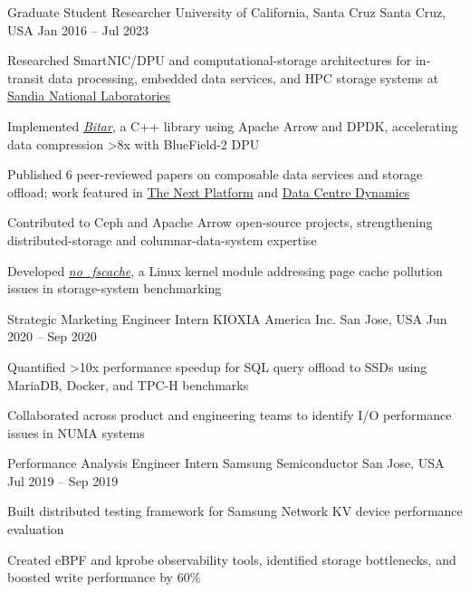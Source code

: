 \begin{cventries}
  \cventry
    {Graduate Student Researcher} %
    {University of California, Santa Cruz} %
    {Santa Cruz, USA} %
    {Jan 2016 -- Jul 2023} %
    {
      \begin{cvitems} %
        \item {Researched SmartNIC/DPU and computational-storage architectures for in-transit data processing, embedded data services, and HPC storage systems at \href{https://www.sandia.gov/}{Sandia National Laboratories}}
        \item {Implemented \href{https://github.com/ljishen/bitar}{\textit{Bitar}}, a C++ library using Apache Arrow and DPDK, accelerating data compression \textgreater 8x with BlueField-2 DPU}
        \item {Published 6 peer-reviewed papers on composable data services and storage offload; work featured in \href{https://www.nextplatform.com/2021/05/24/testing-the-limits-of-the-bluefield-2-smartnic/}{The Next Platform} and \href{https://www.datacenterdynamics.com/en/news/intel-pitches-infrastructure-processing-unit-as-new-data-center-dpu/}{Data Centre Dynamics}}
        \item {Contributed to Ceph and Apache Arrow open-source projects, strengthening distributed-storage and columnar-data-system expertise}
        \item {Developed \href{https://github.com/ljishen/nofscache}{\textit{no\_fscache}}, a Linux kernel module addressing page cache pollution issues in storage-system benchmarking}
      \end{cvitems}
    }

  \cventry
    {Strategic Marketing Engineer Intern} %
    {KIOXIA America Inc.} %
    {San Jose, USA} %
    {Jun 2020 -- Sep 2020} %
    {
      \begin{cvitems} %
        \item {Quantified \textgreater 10x performance speedup for SQL query offload to SSDs using MariaDB, Docker, and TPC-H benchmarks}
        \item {Collaborated across product and engineering teams to identify I/O performance issues in NUMA systems}
      \end{cvitems}
    }

  \cventry
    {Performance Analysis Engineer Intern} %
    {Samsung Semiconductor} %
    {San Jose, USA} %
    {Jul 2019 -- Sep 2019} %
    {
      \begin{cvitems} %
        \item {Built distributed testing framework for Samsung Network KV device performance evaluation}
        \item {Created eBPF and kprobe observability tools, identified storage bottlenecks, and boosted write performance by 60\%}
      \end{cvitems}
    }


\end{cventries}
